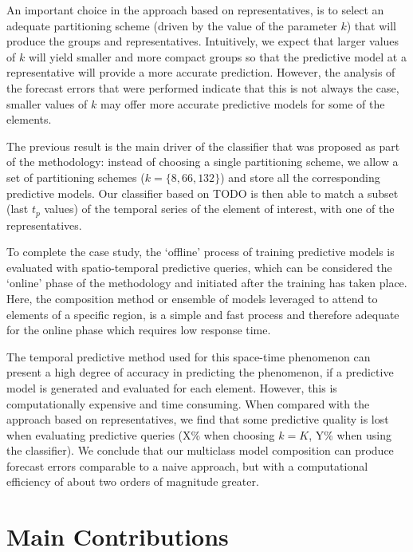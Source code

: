 An important choice in the approach based on representatives, is to select an adequate partitioning scheme (driven by the value of the parameter $k$) that will produce the groups and representatives. Intuitively, we expect that larger values of $k$ will yield smaller and more compact groups so that the predictive model at a representative will provide a more accurate prediction. However, the analysis of the forecast errors that were performed indicate that this is not always the case, smaller values of $k$ may offer more accurate predictive models for some of the elements.

The previous result is the main driver of the classifier that was proposed as part of the methodology: instead of choosing a single partitioning scheme, we allow a set of partitioning schemes ($k = \lbrace 8, 66, 132 \rbrace$) and store all the corresponding predictive models. Our classifier based on TODO is then able to match a subset (last $t_p$ values) of the temporal series of the element of interest, with one of the representatives.

To complete the case study, the `offline' process of training predictive models is evaluated with spatio-temporal predictive queries, which can be considered the `online' phase of the methodology and initiated after the training has taken place. Here, the composition method or ensemble of models leveraged to attend to elements of a specific region, is a simple and fast process and therefore adequate for the online phase which requires low response time.

The temporal predictive method used for this space-time phenomenon can present a high degree of accuracy in predicting the phenomenon, if a predictive model is generated and evaluated for each element. However, this is computationally expensive and time consuming. When compared with the approach based on representatives, we find that some predictive quality is lost when evaluating predictive queries (X\% when choosing $k=K$, Y\% when using the classifier). We conclude that our multiclass model composition can produce forecast errors comparable to a naive approach, but with a computational efficiency of about two orders of magnitude greater.

\section{Main Contributions}
\label{Sec:MainContributions}

